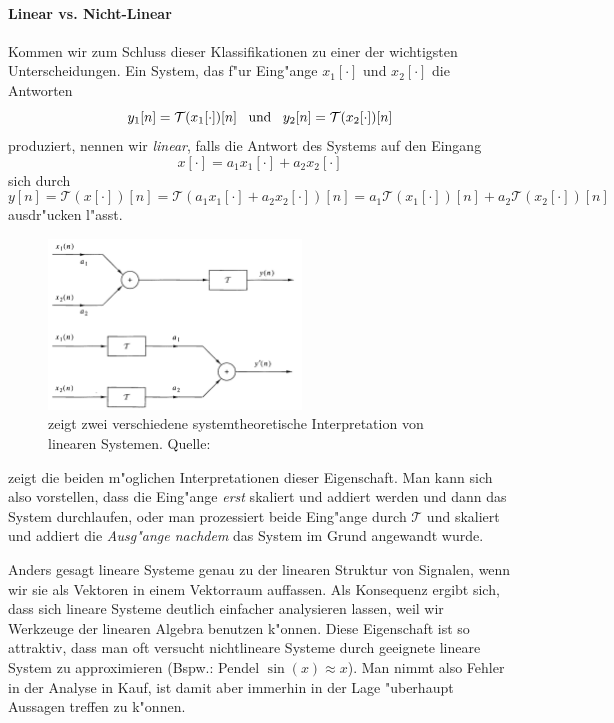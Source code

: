 \paragraph{Linear vs. Nicht-Linear} Kommen wir zum Schluss dieser Klassifikationen zu einer der wichtigsten Unterscheidungen.
Ein System, das f"ur Eing"ange $x_1[\cdot]$ und $x_2[\cdot]$ die Antworten
\[
    y_1[n] = \mathcal{T}(x_1[\cdot])[n]
    {\hspace{3mm} \text{und} \hspace{3mm}}
    y_2[n] = \mathcal{T}(x_2[\cdot])[n]
\]
produziert, nennen wir \emph{linear}, falls die Antwort des Systems auf den Eingang
\[
    x[\cdot] = a_1 x_1[\cdot] + a_2 x_2[\cdot]
\]
sich durch
\[
    y[n]
        = \mathcal{T}(x[\cdot])[n] 
        = \mathcal{T}(a_1 x_1[\cdot] + a_2 x_2[\cdot])[n] 
        = a_1 \mathcal{T}(x_1[\cdot])[n] 
            + a_2 \mathcal{T}(x_2[\cdot])[n] 
\]
ausdr"ucken l"asst.
%
\begin{figure}
    \centering\includegraphics[width=0.6\textwidth]{img/disc_sys/linear_sys.png}
    \caption{zeigt zwei verschiedene systemtheoretische Interpretation von linearen Systemen. Quelle: \cite{proakis2013}}\label{img:disc_sys:linear_sys}
\end{figure}
%

 zeigt die beiden m"oglichen Interpretationen dieser Eigenschaft.
Man kann sich also vorstellen, dass die Eing"ange \emph{erst} skaliert und addiert werden und dann das System durchlaufen, oder man prozessiert beide Eing"ange durch $\mathcal{T}$ und skaliert und addiert die \emph{Ausg"ange nachdem} das System im Grund  angewandt wurde.

Anders gesagt  lineare Systeme genau zu der linearen Struktur von Signalen, wenn wir sie als Vektoren in einem Vektorraum auffassen.
Als Konsequenz ergibt sich, dass sich lineare Systeme deutlich einfacher analysieren lassen, weil wir Werkzeuge der linearen Algebra benutzen k"onnen.
Diese Eigenschaft ist so attraktiv, dass man oft versucht nichtlineare Systeme durch geeignete lineare System zu approximieren (Bspw.: Pendel $\sin(x) \approx x$).
Man nimmt also Fehler in der Analyse in Kauf, ist damit aber immerhin in der Lage "uberhaupt Aussagen treffen zu k"onnen.
%